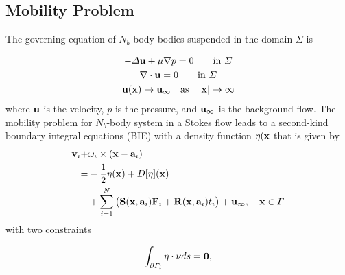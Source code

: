 \documentclass[lineno]{jfm}
\begin{document}


\subsection{\label{mobility}Mobility Problem}

The governing equation of $N_b$-body bodies suspended in the domain $\Sigma$ is
 
\begin{gather}
	-\Delta {\bf u} + \mu\nabla p = 0 \qquad \text{in }\Sigma\\
	\nabla\cdot {\bf u}=0 \qquad \text{in }\Sigma\\
	{\bf u}({\bf x}) \to {\bf u}_\infty \quad \text{as}\quad |{\bf x}|\to \infty
\end{gather}
%
where ${\bf u}$ is the velocity, $p$ is the pressure, and ${\bf u}_\infty$ is the background flow. 
%
%
The mobility problem for $N_b$-body system in a Stokes flow leads to a second-kind boundary integral equations (BIE) with a density function $\eta({\bf x}$ that is given by \cite{Lukas19}
\begin{equation}
\label{mobility}
\begin{aligned}
{\bf v}_i + &\omega_i\times({\bf x}-{\bf a}_i)\\
 =& -\frac12\eta({\bf x}) + D[\eta]({\bf x}) \\
&+ \sum_{i=1}^N\big({\bf S}({\bf x}, {\bf a}_i){\bf F}_i+ {\bf R}({\bf x}, {\bf a}_i)t_i\big)+{\bf u}_\infty, \quad {\bf x}\in\Gamma \\
\end{aligned}
\end{equation}
%
with two constraints 
%
\begin{center}
\begin{equation}
\label{mobility2}
\int_{\partial \Gamma_i}\eta\cdot \nu ds = {\bf 0},
\end{equation}
\end{center}
\end{document}
